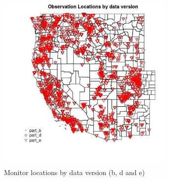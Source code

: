 \begin{figure} 
\centering  
\includegraphics[width=0.77\textwidth]{Code_Outputs/PM25_obs_locations_by_data_version_Obs_Locations_versions_bde.jpg} 
\caption{\label{fig:PM25_obs_locations_by_data_versionObs_Locations_versions_bde}Monitor locations by data version (b, d and e)} 
\end{figure} 
 
